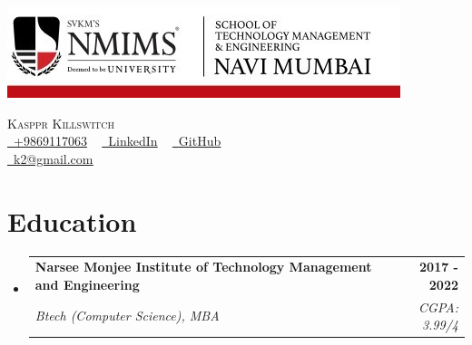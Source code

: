 \documentclass[letterpaper,11pt]{article}
\makeatletter
\newcommand{\resumeSubheading}[4]{
  \vspace{-2pt}\item
    \begin{tabular*}{1.0\textwidth}[t]{l@{\extracolsep{\fill}}r}
      \textbf{#1} & \textbf{\small #2} \\
      \textit{\small#3} & \textit{\small #4} \\
    \end{tabular*}\vspace{-7pt}
}
\newcommand{\resumeSubHeadingListStart}{\begin{itemize}[leftmargin=0.0in, label={}]}
\newcommand{\resumeSubHeadingListEnd}{\end{itemize}}
\makeatother
\begin{document}
\begin{center}
\begin{minipage}{0.55\textwidth}
\includegraphics[scale=3]{nmims_logo.jpg}
\end{minipage}
\begin{minipage}{0.4\textwidth}
\raggedright
    {\huge \scshape Kasppr Killswitch } \\
    \vspace{1pt}
   { 
    \href{tel:+9869117063}{\small \raisebox{-0.1\height}\faPhone\ \underline{+9869117063}} ~
    \href{https://towardsdatascience.com/merge-dictionaries-}{\raisebox{-0.2\height}\faLinkedin\ \underline{LinkedIn}}  ~
    \href{https://towardsdatascience.com/merge-dictionaries-}{\raisebox{-0.2\height}\faGithub\ \underline{GitHub}}\\
    \href{mailto:k2@gmail.com}{\raisebox{-0.2\height}\faEnvelope\  \underline{k2@gmail.com}}\\
    }
\end{minipage}
\vspace{4pt}

    \vspace{-8pt}
\end{center}


\section{Education}
  \resumeSubHeadingListStart
    \resumeSubheading
      {Narsee Monjee Institute of Technology Management and  Engineering}{2017 - 2022}
      {Btech (Computer Science), MBA}{CGPA: 3.99/4}
  \resumeSubHeadingListEnd
\end{document}
